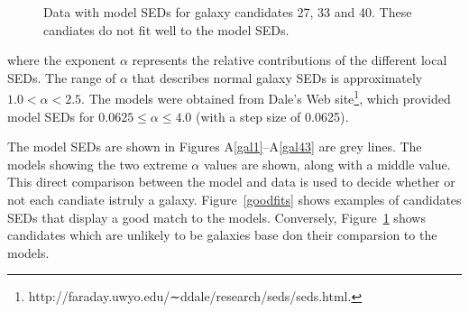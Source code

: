 \documentclass[times,usenatbib]{mn2e}
\begin{document}
\begin{figure}
\begin{center}
\caption{Data with model SEDs for galaxy candidates 27, 33 and 40. These candiates do not fit well to the model SEDs.}
\label{badfits}
\end{center}
\end{figure} 
 
where the exponent $\alpha$ represents the relative contributions of the different local SEDs. The range of $\alpha$ that describes normal galaxy SEDs is approximately $1.0 < \alpha < 2.5$. The models were obtained from Dale’s Web site\footnote{http://faraday.uwyo.edu/∼ddale/research/seds/seds.html.}, which provided model SEDs for $0.0625 \leq \alpha \leq 4.0$ (with a step size of 0.0625).

The model SEDs are shown in Figures A\ref{gal1}--A\ref{gal43} are grey lines. The models showing the two extreme $\alpha$ values are shown, along with a middle value. This direct comparison between the model and data is used to decide whether or not each candiate istruly a galaxy. Figure~\ref{goodfits} shows examples of candidates SEDs that display a good match to the models. Conversely, Figure~\ref{badfits} shows candidates which are unlikely to be galaxies base don their comparsion to the models.
\end{document}
